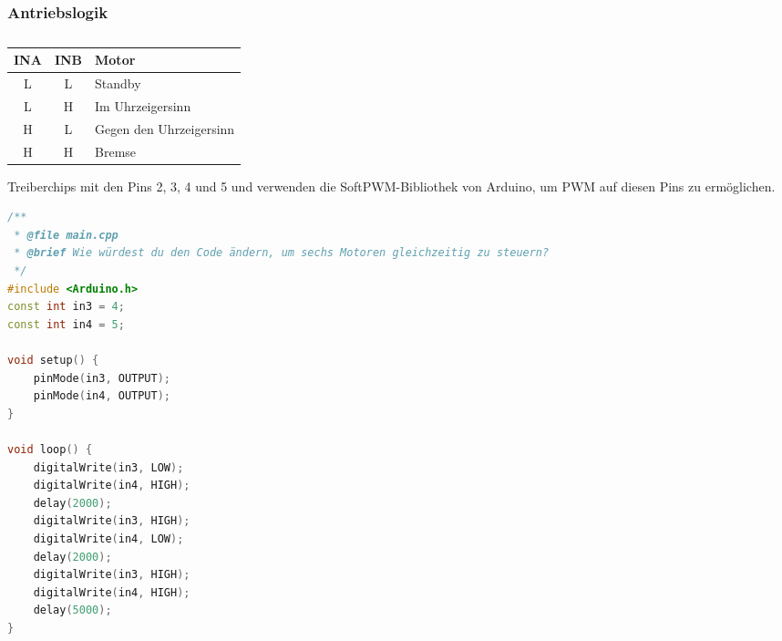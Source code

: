 \documentclass{vorlage-design-main}
\begin{document}
\hypertarget{antriebslogik}{%
\subsubsection{Antriebslogik}\label{antriebslogik}}

\begin{table}[!ht]
\caption{}%
\begin{tabular}{@{}ccl@{}}

\toprule
INA & INB & Motor \\
\midrule[\heavyrulewidth]

L & L & Standby \\
L & H & Im Uhrzeigersinn \\
H & L & Gegen den Uhrzeigersinn \\
H & H & Bremse \\
\bottomrule

\end{tabular}
\floatnotes{}
\end{table}

Treiberchips mit den Pins 2, 3, 4 und 5 und verwenden die
SoftPWM-Bibliothek von Arduino, um PWM auf diesen Pins zu ermöglichen.

\begin{lstlisting}[language={C++}]
/**
 * @file main.cpp
 * @brief Wie würdest du den Code ändern, um sechs Motoren gleichzeitig zu steuern?
 */
#include <Arduino.h>
const int in3 = 4;
const int in4 = 5;

void setup() {
    pinMode(in3, OUTPUT);
    pinMode(in4, OUTPUT);
}

void loop() {
    digitalWrite(in3, LOW);
    digitalWrite(in4, HIGH);
    delay(2000);
    digitalWrite(in3, HIGH);
    digitalWrite(in4, LOW);
    delay(2000);
    digitalWrite(in3, HIGH);
    digitalWrite(in4, HIGH);
    delay(5000);
}
\end{lstlisting}
\end{document}
